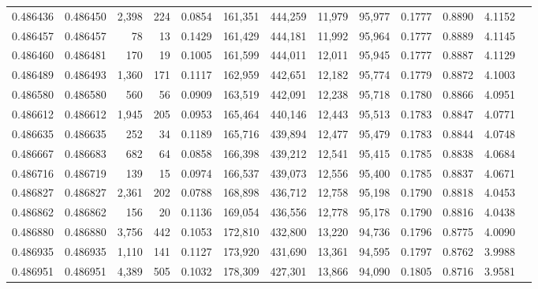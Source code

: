 \begin{tabular}{rrrrrrrrrrrrr}
0.486436 & 0.486450 & 2,398 &   224 &                                     0.0854 & 161,351 & 444,259 &  11,979 &  95,977 & 0.1777 & 0.8890 & 4.1152 \\
0.486457 & 0.486457 &    78 &    13 &                                     0.1429 & 161,429 & 444,181 &  11,992 &  95,964 & 0.1777 & 0.8889 & 4.1145 \\
0.486460 & 0.486481 &   170 &    19 &                                     0.1005 & 161,599 & 444,011 &  12,011 &  95,945 & 0.1777 & 0.8887 & 4.1129 \\
0.486489 & 0.486493 & 1,360 &   171 &                                     0.1117 & 162,959 & 442,651 &  12,182 &  95,774 & 0.1779 & 0.8872 & 4.1003 \\
0.486580 & 0.486580 &   560 &    56 &                                     0.0909 & 163,519 & 442,091 &  12,238 &  95,718 & 0.1780 & 0.8866 & 4.0951 \\
0.486612 & 0.486612 & 1,945 &   205 &                                     0.0953 & 165,464 & 440,146 &  12,443 &  95,513 & 0.1783 & 0.8847 & 4.0771 \\
0.486635 & 0.486635 &   252 &    34 &                                     0.1189 & 165,716 & 439,894 &  12,477 &  95,479 & 0.1783 & 0.8844 & 4.0748 \\
0.486667 & 0.486683 &   682 &    64 &                                     0.0858 & 166,398 & 439,212 &  12,541 &  95,415 & 0.1785 & 0.8838 & 4.0684 \\
0.486716 & 0.486719 &   139 &    15 &                                     0.0974 & 166,537 & 439,073 &  12,556 &  95,400 & 0.1785 & 0.8837 & 4.0671 \\
0.486827 & 0.486827 & 2,361 &   202 &                                     0.0788 & 168,898 & 436,712 &  12,758 &  95,198 & 0.1790 & 0.8818 & 4.0453 \\
0.486862 & 0.486862 &   156 &    20 &                                     0.1136 & 169,054 & 436,556 &  12,778 &  95,178 & 0.1790 & 0.8816 & 4.0438 \\
0.486880 & 0.486880 & 3,756 &   442 &                                     0.1053 & 172,810 & 432,800 &  13,220 &  94,736 & 0.1796 & 0.8775 & 4.0090 \\
0.486935 & 0.486935 & 1,110 &   141 &                                     0.1127 & 173,920 & 431,690 &  13,361 &  94,595 & 0.1797 & 0.8762 & 3.9988 \\
0.486951 & 0.486951 & 4,389 &   505 &                                     0.1032 & 178,309 & 427,301 &  13,866 &  94,090 & 0.1805 & 0.8716 & 3.9581 \\

\end{tabular}
